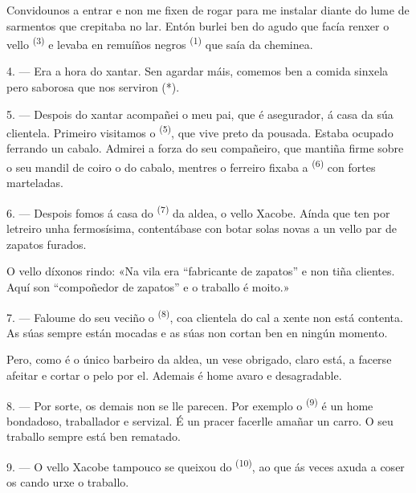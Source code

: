 Convidounos a entrar e non me fixen de rogar para me instalar diante do lume de sarmentos que
crepitaba no lar. Entón burlei ben do agudo  que facía renxer o vello
 \textsuperscript{(3)} e levaba en remuíños negros 
\textsuperscript{(1)} que saía da cheminea.

4. --- Era a hora do xantar. Sen agardar máis, comemos ben a comida sinxela pero saborosa que
nos serviron (*).

\VUsaut{3.0mm}

5. --- Despois do xantar acompañei o meu pai, que é asegurador, á casa da súa clientela.
Primeiro visitamos o  \textsuperscript{(5)}, que vive preto da pousada.
Estaba ocupado ferrando un cabalo. Admirei a forza do seu compañeiro, que mantiña firme sobre
o seu mandil de coiro o  do cabalo, mentres o ferreiro fixaba a
 \textsuperscript{(6)} con fortes marteladas.

6. --- Despois fomos á casa do  \textsuperscript{(7)} da aldea, o vello
Xacobe. Aínda que ten por letreiro unha  fermosísima, contentábase con botar
solas novas a un vello par de zapatos furados.

O vello díxonos rindo: «Na vila era “fabricante de zapatos” e non tiña clientes. Aquí son
“compoñedor de zapatos” e o traballo é moito.»

7. --- Faloume do seu veciño o  \textsuperscript{(8)}, coa clientela do cal a
xente non está contenta. As súas  sempre están mocadas e as súas
 non cortan ben en ningún momento.

Pero, como é o único barbeiro da aldea, un vese obrigado, claro está, a facerse afeitar e
cortar o pelo por el. Ademais é home avaro e desagradable.

8. --- Por sorte, os demais  non se lle parecen. Por exemplo o
 \textsuperscript{(9)} é un home bondadoso, traballador e
servizal. É un pracer facerlle amañar un carro. O seu traballo sempre está ben rematado.

9. --- O vello Xacobe tampouco se queixou do  \textsuperscript{(10)}, ao
que ás veces axuda a coser os  cando urxe o traballo.

